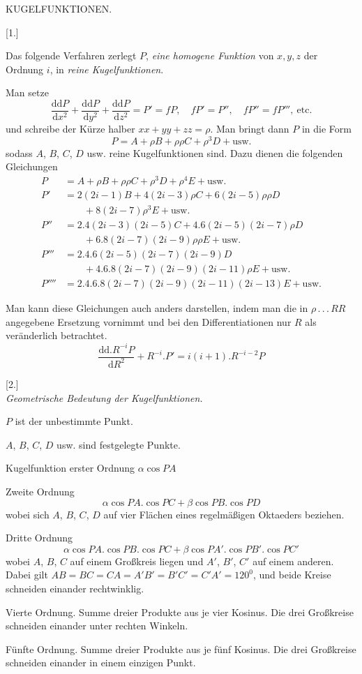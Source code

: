 \begin{center}KUGELFUNKTIONEN.\end{center}
\begin{center}[1.]\end{center}
Das folgende Verfahren zerlegt $P$, \textit{eine homogene Funktion} von $x,y,z$ der Ordnung $i$, in \textit{reine Kugelfunktionen}.

Man setze
\[
\frac{\mathrm d\mathrm dP}{\mathrm dx^2}+\frac{\mathrm d\mathrm dP}{\mathrm dy^2}+\frac{\mathrm d\mathrm dP}{\mathrm dz^2}=P'=fP,\quad fP'=P'',\quad fP''=fP''',\ \text{etc.}
\]
und schreibe der Kürze halber $xx+yy+zz=\rho$. Man bringt dann $P$ in die Form
\[
P=A+\rho B+\rho\rho C+\rho^3D+\text{usw.}
\]
sodass $A$, $B$, $C$, $D$ usw. reine Kugelfunktionen sind. Dazu dienen die folgenden Gleichungen
\[
\begin{aligned}
P&=A+\rho B+\rho\rho C+\rho^3D+\rho^4E+\text{usw.}\\
P'&=2(2i-1)B+4(2i-3)\rho C+6(2i-5)\rho\rho D\\
&\qquad+8(2i-7)\rho^3E+\text{usw.}\\
P''&=2.4(2i-3)(2i-5)C+4.6(2i-5)(2i-7)\rho D\\
&\qquad+6.8(2i-7)(2i-9)\rho\rho E+\text{usw.}\\
P'''&=2.4.6(2i-5)(2i-7)(2i-9)D\\
&\qquad+4.6.8(2i-7)(2i-9)(2i-11)\rho E+\text{usw.}\\
P''''&=2.4.6.8(2i-7)(2i-9)(2i-11)(2i-13)E+\text{usw.}
\end{aligned}
\]

Man kann diese Gleichungen auch anders darstellen, indem man die in $\rho\, .\, .\, .\,RR$ angegebene Ersetzung vornimmt und bei den Differentiationen nur $R$ als veränderlich betrachtet.
\[
\frac{\mathrm d\mathrm d.R^{-i}P}{\mathrm dR^2}+R^{-i}.P'=i(i+1).R^{-i-2}P
\]

\begin{center}[2.]\\\textit{Geometrische Bedeutung der Kugelfunktionen.}\end{center}
$P$ ist der unbestimmte Punkt.

$A$, $B$, $C$, $D$ usw. sind festgelegte Punkte.

Kugelfunktion erster Ordnung $\alpha\cos PA$

Zweite Ordnung
\[
\alpha\cos PA.\cos PC+\beta\cos PB.\cos PD
\]
wobei sich $A$, $B$, $C$, $D$ auf vier Flächen eines regelmäßigen Oktaeders beziehen.
\begin{center}\end{center}
Dritte Ordnung
\[
\alpha\cos PA.\cos PB.\cos PC+\beta\cos PA'.\cos PB'.\cos PC'
\]
wobei $A$, $B$, $C$ auf einem Großkreis liegen und $A'$, $B'$, $C'$ auf einem anderen. Dabei gilt $AB=BC=CA=A'B'=B'C'=C'A'=120^0$, und beide Kreise schneiden einander rechtwinklig.

Vierte Ordnung. Summe dreier Produkte aus je vier Kosinus. Die drei Großkreise schneiden einander unter rechten Winkeln.

Fünfte Ordnung. Summe dreier Produkte aus je fünf Kosinus. Die drei Großkreise schneiden einander in einem einzigen Punkt.

